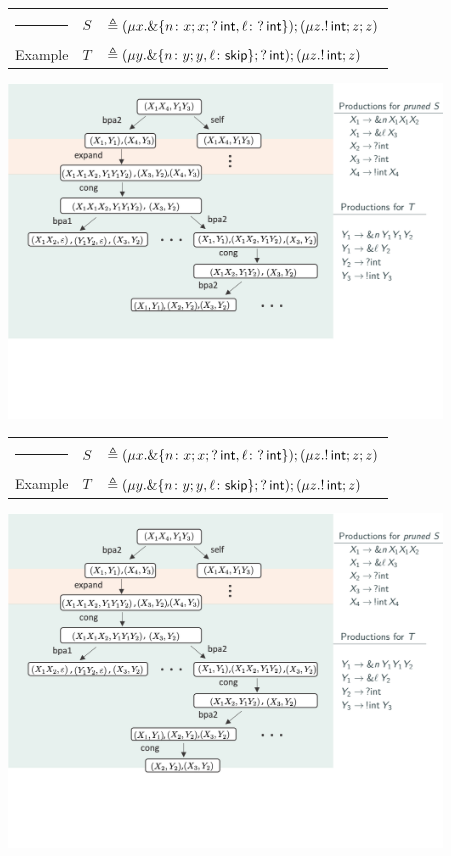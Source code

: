 \message{ !name(main.tex)}\documentclass[10pt]{beamer}
\begin{document}
\begin{frame}
	\begin{tabular} {l l l }
  		{\color{teal}\rule{3cm}{2pt}} &  $S$ &$\triangleq (\mu x. \&\{n\colon x;x;?\,\mathsf{int},
      \ell\colon ?\,\mathsf{int} \});( \mu z. !\,\mathsf{int}; z;z )$\\
  		{\color{teal} Example}  &  $T$ &$\triangleq (\mu y. \&\{n\colon y;y,
      \ell\colon \mathsf{skip} \}; ?\,\mathsf{int}); (\mu z. !\,\mathsf{int}; z)$
	\end{tabular}
	\vspace*{2mm}
	\includegraphics[width=11.5cm]{img/exemplo-3}\smallskip
\end{frame}

\begin{frame}
	\begin{tabular} {l l l }
  		{\color{teal}\rule{3cm}{2pt}} &  $S$ &$\triangleq (\mu x. \&\{n\colon x;x;?\,\mathsf{int},
      \ell\colon ?\,\mathsf{int} \});( \mu z. !\,\mathsf{int}; z;z )$\\
  		{\color{teal} Example}  &  $T$ &$\triangleq (\mu y. \&\{n\colon y;y,
      \ell\colon \mathsf{skip} \}; ?\,\mathsf{int}); (\mu z. !\,\mathsf{int}; z)$
	\end{tabular}
	\vspace*{2mm}
	\includegraphics[width=11.5cm]{img/exemplo-2}\smallskip
\end{frame}
\end{document}
